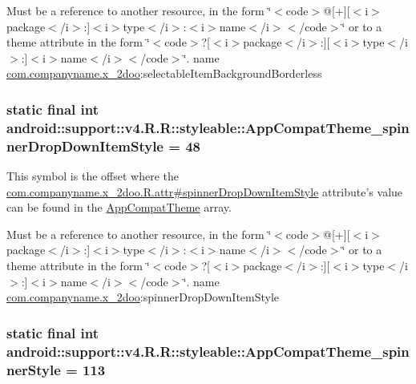 Must be a reference to another resource, in the form \char`\"{}$<$code$>$@\mbox{[}+\mbox{]}\mbox{[}$<$i$>$package$<$/i$>$:\mbox{]}$<$i$>$type$<$/i$>$:$<$i$>$name$<$/i$>$$<$/code$>$\char`\"{} or to a theme attribute in the form \char`\"{}$<$code$>$?\mbox{[}$<$i$>$package$<$/i$>$:\mbox{]}\mbox{[}$<$i$>$type$<$/i$>$:\mbox{]}$<$i$>$name$<$/i$>$$<$/code$>$\char`\"{}.  name \hyperlink{namespacecom_1_1companyname_1_1x__2doo}{com.companyname.x\_\-2doo}:selectableItemBackgroundBorderless \hypertarget{classandroid_1_1support_1_1v4_1_1_r_1_1styleable_2214d9a18b7e5f85a1399a543215d936}{
\subsubsection[{AppCompatTheme\_\-spinnerDropDownItemStyle}]{\setlength{\rightskip}{0pt plus 5cm}static final int android::support::v4.R.R::styleable::AppCompatTheme\_\-spinnerDropDownItemStyle = 48}}
\label{classandroid_1_1support_1_1v4_1_1_r_1_1styleable_2214d9a18b7e5f85a1399a543215d936}


This symbol is the offset where the \hyperlink{classcom_1_1companyname_1_1x__2doo_1_1_r_1_1attr_2a264d0ce8c5b03dd4adc0a12afddf80}{com.companyname.x\_\-2doo.R.attr\#spinnerDropDownItemStyle} attribute's value can be found in the \hyperlink{classandroid_1_1support_1_1v4_1_1_r_1_1styleable_0873e92ba21076bb5a4aeadeb7f5779f}{AppCompatTheme} array.

Must be a reference to another resource, in the form \char`\"{}$<$code$>$@\mbox{[}+\mbox{]}\mbox{[}$<$i$>$package$<$/i$>$:\mbox{]}$<$i$>$type$<$/i$>$:$<$i$>$name$<$/i$>$$<$/code$>$\char`\"{} or to a theme attribute in the form \char`\"{}$<$code$>$?\mbox{[}$<$i$>$package$<$/i$>$:\mbox{]}\mbox{[}$<$i$>$type$<$/i$>$:\mbox{]}$<$i$>$name$<$/i$>$$<$/code$>$\char`\"{}.  name \hyperlink{namespacecom_1_1companyname_1_1x__2doo}{com.companyname.x\_\-2doo}:spinnerDropDownItemStyle \hypertarget{classandroid_1_1support_1_1v4_1_1_r_1_1styleable_07bdf94f02decf6c8be39649927ee6ad}{
\subsubsection[{AppCompatTheme\_\-spinnerStyle}]{\setlength{\rightskip}{0pt plus 5cm}static final int android::support::v4.R.R::styleable::AppCompatTheme\_\-spinnerStyle = 113}}
\label{classandroid_1_1support_1_1v4_1_1_r_1_1styleable_07bdf94f02decf6c8be39649927ee6ad}


